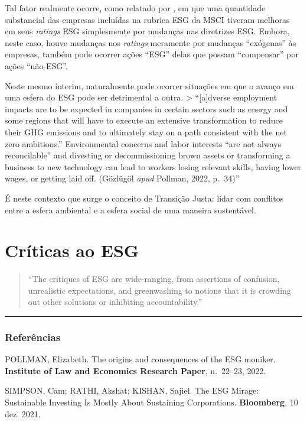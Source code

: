 \documentclass[12pt]{article}
\numberwithin{equation}{section}
\theoremstyle{plain}
\theoremstyle{definition}
\theoremstyle{remark}
\begin{document}
Tal fator realmente ocorre, como relatado por \textcite{Simpson2021}, em que uma quantidade substancial das empresas incluídas na rubrica ESG da MSCI tiveram melhoras em seus \textit{ratings} ESG simplesmente por mudanças nas diretrizes ESG. Embora, neste caso, houve mudanças nos \textit{ratings} meramente por mudanças ``exógenas'' às empresas, também pode ocorrer ações ``ESG'' delas que possam ``compensar'' por ações ``não-ESG''.

Neste mesmo ínterim, naturalmente pode ocorrer situações em que o avanço em uma esfera do ESG pode ser detrimental a outra. \textgreater{} ``{[}a{]}dverse employment impacts are to be expected in companies in certain sectors such as energy and some regions that will have to execute an extensive transformation to reduce their GHG emissions and to ultimately stay on a path consistent with the net zero ambitions.'' Environmental concerns and labor interests ``are not always reconcilable'' and divesting or decommissioning brown assets or transforming a business to new technology can lead to workers losing relevant skills, having lower wages, or getting laid off. (Gözlügöl \textit{apud} Pollman, 2022, p.~34)''

É neste contexto que surge o conceito de Transição Justa: lidar com conflitos entre a esfera ambiental e a esfera social de uma maneira sustentável.

\hypertarget{cruxedticas-ao-esg}{%
\section{Críticas ao ESG}\label{cruxedticas-ao-esg}}

\begin{quote}
``The critiques of ESG are wide-ranging, from assertions of confusion, unrealistic expectations, and greenwashing to notions that it is crowding out other solutions or inhibiting accountability.'' \parencite[, p. 35]{Pollman2022}
\end{quote}

\begin{center}\rule{0.5\linewidth}{0.5pt}\end{center}

\hypertarget{referuxeancias}{%
\subsubsection{Referências}\label{referuxeancias}}

POLLMAN, Elizabeth. The origins and consequences of the ESG moniker. \textbf{Institute of Law and Economics Research Paper}, n.~22--23, 2022.

SIMPSON, Cam; RATHI, Akshat; KISHAN, Sajiel. The ESG Mirage: Sustainable Investing Is Mostly About Sustaining Corporations. \textbf{Bloomberg}, 10 dez. 2021.

\printbibliography
\end{document}
